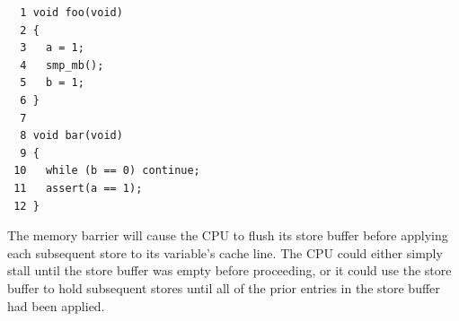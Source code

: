 \vspace{5pt}
\begin{minipage}[t]{\columnwidth}
\small
\begin{verbatim}
  1 void foo(void)
  2 {
  3   a = 1;
  4   smp_mb();
  5   b = 1;
  6 }
  7
  8 void bar(void)
  9 {
 10   while (b == 0) continue;
 11   assert(a == 1);
 12 }
\end{verbatim}
\end{minipage}
\vspace{5pt}

The memory barrier  will cause the CPU to flush its store
buffer before applying each subsequent store to its variable's cache line.
The CPU could either simply stall until the store buffer was empty
before proceeding, or it could use the store buffer to hold subsequent
stores until all of the prior entries in the store buffer had been
applied.

